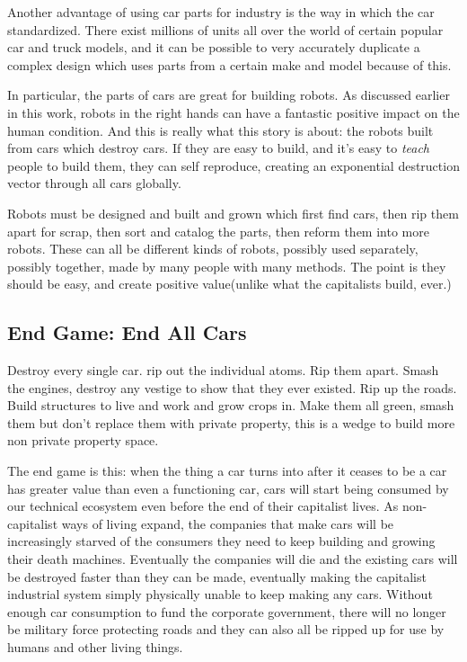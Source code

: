 Another advantage of using car parts for industry is the way in which
the car standardized. There exist millions of units all over the world
of certain popular car and truck models, and it can be possible to very
accurately duplicate a complex design which uses parts from a certain
make and model because of this.

In particular, the parts of cars are great for building robots. As
discussed earlier in this work, robots in the right hands can have a
fantastic positive impact on the human condition. And this is really
what this story is about: the robots built from cars which destroy cars.
If they are easy to build, and it's easy to \emph{teach} people to build
them, they can self reproduce, creating an exponential destruction
vector through all cars globally.

Robots must be designed and built and grown which first find cars, then
rip them apart for scrap, then sort and catalog the parts, then reform
them into more robots. These can all be different kinds of robots,
possibly used separately, possibly together, made by many people with
many methods. The point is they should be easy, and create positive
value(unlike what the capitalists build, ever.)

\subsection{End Game: End All Cars}\label{end-game-end-all-cars}

Destroy every single car. rip out the individual atoms. Rip them apart.
Smash the engines, destroy any vestige to show that they ever existed.
Rip up the roads. Build structures to live and work and grow crops in.
Make them all green, smash them but don't replace them with private
property, this is a wedge to build more non private property space.

The end game is this: when the thing a car turns into after it ceases to
be a car has greater value than even a functioning car, cars will start
being consumed by our technical ecosystem even before the end of their
capitalist lives. As non-capitalist ways of living expand, the companies
that make cars will be increasingly starved of the consumers they need
to keep building and growing their death machines. Eventually the
companies will die and the existing cars will be destroyed faster than
they can be made, eventually making the capitalist industrial system
simply physically unable to keep making any cars. Without enough car
consumption to fund the corporate government, there will no longer be
military force protecting roads and they can also all be ripped up for
use by humans and other living things.

